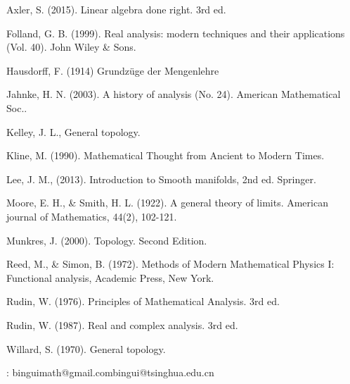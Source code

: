 \documentclass[12pt,b5paper,notitlepage]{article}
\theoremstyle{definition}
\theoremstyle{plain}
\numberwithin{equation}{section}
\begin{document}
\hypertarget{beforeindex}{}











































\newpage

\printindex	






	\begin{thebibliography}{999999}
		\footnotesize	

Axler, S. (2015). Linear algebra done right. 3rd ed.

Folland, G. B. (1999). Real analysis: modern techniques and their applications (Vol. 40). John Wiley \& Sons.


Hausdorff, F. (1914) Grundz\"uge der Mengenlehre

Jahnke, H. N. (2003). A history of analysis (No. 24). American Mathematical Soc..


Kelley, J. L., General topology. 

Kline, M. (1990). Mathematical Thought from Ancient to Modern Times.

Lee, J. M., (2013). Introduction to Smooth manifolds, 2nd ed. Springer.

Moore, E. H., \& Smith, H. L. (1922). A general theory of limits. American journal of Mathematics, 44(2), 102-121.

Munkres, J. (2000). Topology. Second Edition.


Reed, M., \& Simon, B. (1972). Methods of Modern Mathematical Physics I: Functional analysis, Academic Press, New York.


Rudin, W. (1976). Principles of Mathematical Analysis. 3rd ed.

Rudin, W. (1987). Real and complex analysis. 3rd ed. 


Willard, S. (1970). General topology. 

		
\end{thebibliography}


: binguimath@gmail.com\qquad bingui@tsinghua.edu.cn
\end{document}
